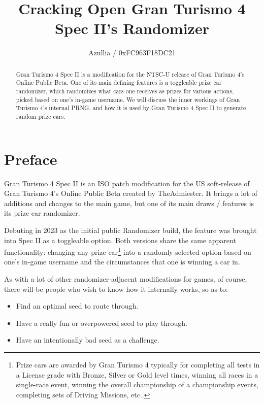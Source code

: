 \documentclass[14pt,a4paper,notitlepage]{extarticle}
\author{Azullia / 0xFC963F18DC21}
\title{\textbf{\huge{Cracking Open Gran Turismo 4 Spec II's Randomizer}}}
\begin{document}
    \maketitle

    \begin{abstract}
        Gran Turismo 4 Spec II is a modification for the NTSC-U release of Gran Turismo 4's
        Online Public Beta. One of its main defining features is a toggleable prize car
        randomizer, which randomizes what cars one receives as prizes for various actions,
        picked based on one's in-game username. We will discuss the inner workings of Gran
        Turismo 4's internal PRNG, and how it is used by Gran Turismo 4 Spec II to generate
        random prize cars.
    \end{abstract}

    \section*{Preface}
        Gran Turismo 4 Spec II is an ISO patch modification for the US soft-release of
        Gran Turismo 4's Online Public Beta created by TheAdmiester. It brings a lot of
        additions and changes to the main game, but one of its main draws / features is
        its prize car randomizer.

        Debuting in 2023 as the initial public Randomizer build, the feature was brought into
        Spec II as a toggleable option. Both versions share the same apparent functionality:
        changing any prize car\footnote{Prize cars are awarded by Gran Turismo 4 typically for
        completing all tests in a License grade with Bronze, Silver or Gold level times,
        winning all races in a single-race event, winning the overall championship of a
        championship events, completing sets of Driving Missions, etc..} into a
        randomly-selected option based on one's in-game username and the circumstances that one
        is winning a car in.

        As with a lot of other randomizer-adjacent modifications for games, of course, there
        will be people who wish to know how it internally works, so as to:

        \begin{itemize}
            \item Find an optimal seed to route through.
            \item Have a really fun or overpowered seed to play through.
            \item Have an intentionally bad seed as a challenge.
        \end{itemize}
\end{document}
